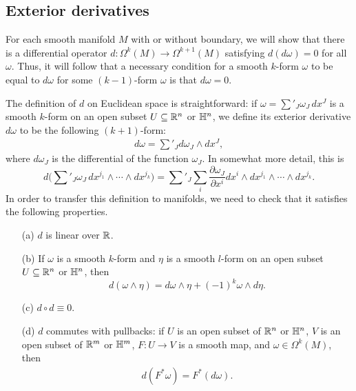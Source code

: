 \subsection{Exterior derivatives}
For each smooth manifold $M$ with or without boundary, we will show that there is a differential operator $d:\Omega^k(M)\to\Omega^{k+1}(M)$ satisfying $d(d\omega)=0$ for all $\omega$. Thus, it will follow that a necessary condition for a smooth $k$-form $\omega$ to be equal to $d\omega$ for some $(k-1)$-form $\omega$ is that $d\omega=0$.\par 
The definition of $d$ on Euclidean space is straightforward: if $\omega=\sum'_J\omega_J\,dx^J$ is a smooth $k$-form on an open subset $U\subseteq\mathbb{R}^n$ or $\mathbb{H}^n$, we define its exterior derivative $d\omega$ to be the following $(k+1)$-form:
\begin{align}\label{ext der R^n}
d\omega=\sum'_Jd\omega_J\wedge dx^J,
\end{align}
where $d\omega_J$ is the differential of the function $\omega_J$. In somewhat more detail, this is
\[d\Big(\sum'_J\omega_J\,dx^{j_1}\wedge\cdots\wedge dx^{j_k}\Big)=\sum'_J\sum_{i}\frac{\partial\omega_J}{\partial x^i}dx^i\wedge dx^{j_1}\wedge\cdots\wedge dx^{j_k}.\]
In order to transfer this definition to manifolds, we need to check that it satisfies the following properties.
\begin{proposition}\label{ext der R^n prop}
\mbox{}
\begin{itemize}
\item[(a)] $d$ is linear over $\mathbb{R}$.
\item[(b)] If $\omega$ is a smooth $k$-form and $\eta$ is a smooth $l$-form on an open subset $U\subseteq\mathbb{R}^n$ or $\mathbb{H}^n$, then
\[d(\omega\wedge\eta)=d\omega\wedge\eta+(-1)^k\omega\wedge d\eta.\]
\item[(c)] $d\circ d\equiv0$.
\item[(d)] $d$ commutes with pullbacks: if $U$ is an open subset of $\mathbb{R}^n$ or $\mathbb{H}^n$, $V$ is an open subset of $\mathbb{R}^m$ or $\mathbb{H}^m$, $F:U\to V$ is a smooth map, and $\omega\in\Omega^k(M)$, then
\begin{align}\label{ext der R^n-1}
d(F^*\omega)=F^*(d\omega).
\end{align}
\end{itemize}
\end{proposition}
